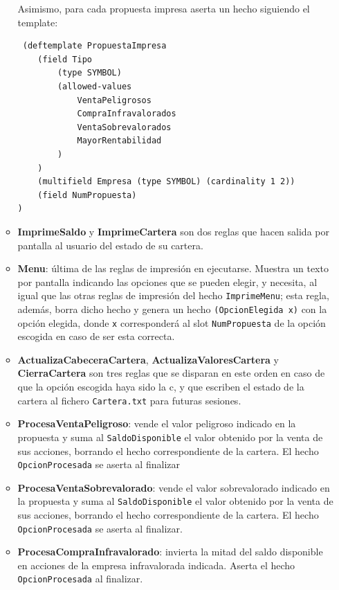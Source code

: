 \documentclass[a4paper,11pt]{article}
\begin{document}
\begin{itemize}
\begin{itemize}
Asimismo, para cada propuesta impresa aserta un hecho siguiendo el template:
\begin{verbatim}
 (deftemplate PropuestaImpresa
    (field Tipo
        (type SYMBOL)
        (allowed-values
            VentaPeligrosos
            CompraInfravalorados
            VentaSobrevalorados
            MayorRentabilidad
        )
    )
    (multifield Empresa (type SYMBOL) (cardinality 1 2))
    (field NumPropuesta)
)
\end{verbatim}

\item \textbf{ImprimeSaldo} y \textbf{ImprimeCartera} son dos reglas que hacen salida por pantalla al usuario del estado
de su cartera.

\item \textbf{Menu}: última de las reglas de impresión en ejecutarse. Muestra un texto por pantalla indicando las opciones
que se pueden elegir, y necesita, al igual que las otras reglas de impresión del hecho \texttt{ImprimeMenu}; esta regla,
además, borra dicho hecho y genera un hecho \texttt{(OpcionElegida x)} con la opción elegida, donde \texttt{x} corresponderá
al slot \texttt{NumPropuesta} de la opción escogida en caso de ser esta correcta.

\item \textbf{ActualizaCabeceraCartera}, \textbf{ActualizaValoresCartera} y \textbf{CierraCartera} son tres reglas que se
disparan en este orden en caso de que la opción escogida haya sido la c, y que escriben el estado de la cartera al fichero
\texttt{Cartera.txt} para futuras sesiones.

\item \textbf{ProcesaVentaPeligroso}: vende el valor peligroso indicado en la propuesta y suma al \texttt{SaldoDisponible}
el valor obtenido por la venta de sus acciones, borrando el hecho correspondiente de la cartera. El hecho \texttt{OpcionProcesada}
se aserta al finalizar

\item \textbf{ProcesaVentaSobrevalorado}: vende el valor sobrevalorado indicado en la propuesta y suma al \texttt{SaldoDisponible}
el valor obtenido por la venta de sus acciones, borrando el hecho correspondiente de la cartera. El hecho \texttt{OpcionProcesada} 
se aserta al finalizar.

\item \textbf{ProcesaCompraInfravalorado}: invierta la mitad del saldo disponible en acciones de la empresa infravalorada
indicada. Aserta el hecho \texttt{OpcionProcesada} al finalizar.


\end{itemize}
\end{itemize}
\end{document}
